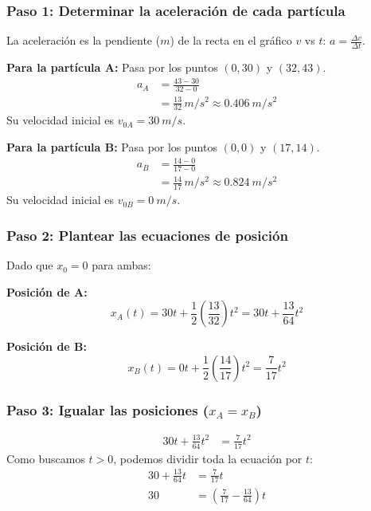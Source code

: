 \documentclass[12pt, a4paper]{article}
\begin{document}
\subsubsection*{Paso 1: Determinar la aceleración de cada partícula}
La aceleración es la pendiente ($m$) de la recta en el gráfico $v$ vs $t$: $a = \frac{\Delta v}{\Delta t}$.

\textbf{Para la partícula A:}
Pasa por los puntos $(0, 30)$ y $(32, 43)$.
\begin{align*}
    a_A &= \frac{43 - 30}{32 - 0} \\
    &= \frac{13}{32} \, \si{m/s^2} \approx \SI{0.406}{m/s^2}
\end{align*}
Su velocidad inicial es $v_{0A} = \SI{30}{m/s}$.

\textbf{Para la partícula B:}
Pasa por los puntos $(0, 0)$ y $(17, 14)$.
\begin{align*}
    a_B &= \frac{14 - 0}{17 - 0} \\
    &= \frac{14}{17} \, \si{m/s^2} \approx \SI{0.824}{m/s^2}
\end{align*}
Su velocidad inicial es $v_{0B} = \SI{0}{m/s}$.

\subsubsection*{Paso 2: Plantear las ecuaciones de posición}
Dado que $x_0 = 0$ para ambas:

\textbf{Posición de A:}
\begin{equation}
    x_A(t) = 30t + \frac{1}{2}\left(\frac{13}{32}\right)t^2 = 30t + \frac{13}{64}t^2
\end{equation}

\textbf{Posición de B:}
\begin{equation}
    x_B(t) = 0t + \frac{1}{2}\left(\frac{14}{17}\right)t^2 = \frac{7}{17}t^2
\end{equation}

\subsubsection*{Paso 3: Igualar las posiciones ($x_A = x_B$)}
\begin{align*}
    30t + \frac{13}{64}t^2 &= \frac{7}{17}t^2
\end{align*}
Como buscamos $t > 0$, podemos dividir toda la ecuación por $t$:
\begin{align*}
    30 + \frac{13}{64}t &= \frac{7}{17}t \\
    30 &= \left( \frac{7}{17} - \frac{13}{64} \right) t
\end{align*}
\end{document}

